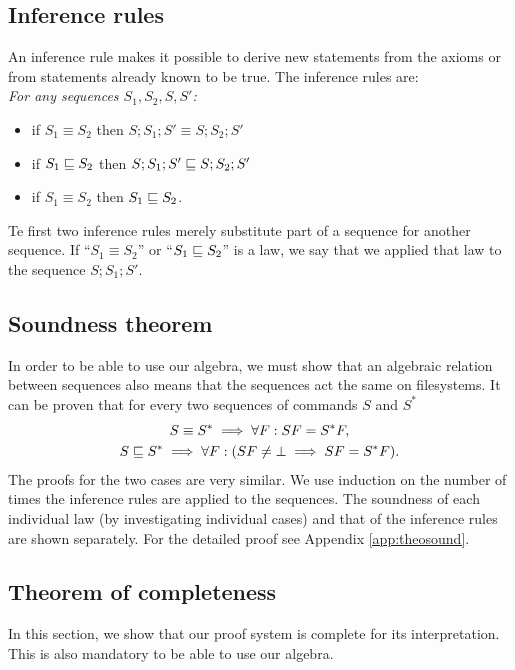 \begin{table}[H]
\subsection{Inference rules}

An inference rule makes it possible to derive new statements from 
the axioms or from statements already known to be true. 
The inference rules are:\\
\emph{For any sequences \(S_1, S_2, S, S'\):}
\begin{itemize}
\item if \(S_1\equiv S_2\) then \(S;S_1;S'\equiv S;S_2;S'\)
\item if \(S_1\sqsubseteq S_2\) then \(S;S_1;S'\sqsubseteq S;S_2;S'\)
\item if \(S_1\equiv S_2\) then \(S_1\sqsubseteq S_2\).
\end{itemize}
Te first two inference rules merely substitute part of a sequence for
another sequence.
If ``\(S_1\equiv S_2\)'' or 
``\(S_1\sqsubseteq S_2\)'' is a law, we say that we applied that law to
the sequence \(S;S_1;S'\).

\subsection{Soundness theorem}
\label{theorem:soundness}
In order to be able to use our algebra,
we must show that an algebraic relation between sequences also means
that the sequences act the same on filesystems.
%
It can be proven that for every two sequences of commands
\(S\) and \(S^*\) 
\begin{gather*}
S\equiv S^* \implies \forall F: SF=S^*F,\\
S\sqsubseteq S^* \implies \forall F: (SF\ne\bot \implies SF=S^*F).
\end{gather*}
The proofs for the two cases are very similar. We use induction on the
number of times the inference rules are applied to the sequences.
The soundness of each individual law
(by investigating individual cases)
and that of the inference rules are shown separately.
For the detailed proof see Appendix \ref{app:theosound}.

\medskip{}

\subsection{Theorem of completeness}
\label{theorem:completeness}
In this section, we show that our proof system is complete for its
interpretation. This is also mandatory to be able to use our algebra.


\end{table}
